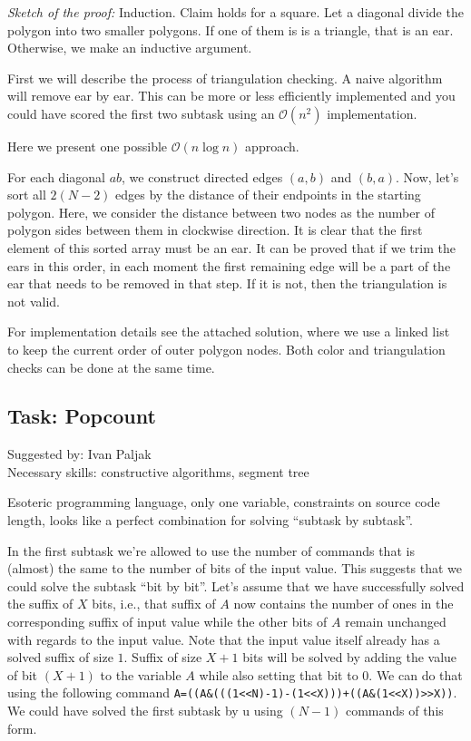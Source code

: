 \documentclass[a4paper]{article}
\begin{document}
\emph{Sketch of the proof: } \; Induction. Claim holds for a square.
Let a diagonal divide the polygon into two smaller polygons. If one of them is
is a triangle, that is an ear. Otherwise, we make an inductive argument.

First we will describe the process of triangulation checking. A naive algorithm
will remove ear by ear. This can be more or less efficiently implemented and
you could have scored the first two subtask using an $\mathcal{O}(n^2)$
implementation.

Here we present one possible $\mathcal{O}(n \log n)$ approach.

For each diagonal $ab$, we construct directed edges $(a, b)$ and $(b, a)$. Now,
let's sort all $2(N-2)$ edges by the distance of their endpoints in the starting
polygon. Here, we consider the distance between two nodes as the number of
polygon sides between them in clockwise direction. It is clear that the first
element of this sorted array must be an ear. It can be proved that if we trim
the ears in this order, in each moment the first remaining edge will be a part
of the ear that needs to be removed in that step. If it is not, then the
triangulation is not valid.

For implementation details see the attached solution, where we use a linked
list to keep the current order of outer polygon nodes. Both color and
triangulation checks can be done at the same time.

\subsection*{Task: Popcount}
\textsf{Suggested by: Ivan Paljak}\\
\textsf{Necessary skills: constructive algorithms, segment tree}

Esoteric programming language, only one variable, constraints on source code
length, looks like a perfect combination for solving ``subtask by subtask''.

In the first subtask we're allowed to use the number of commands that is
(almost) the same to the number of bits of the input value. This suggests
that we could solve the subtask ``bit by bit''. Let's assume that we have
successfully solved the suffix of $X$ bits, i.e., that suffix of $A$ now
contains the number of ones in the corresponding suffix of input value while
the other bits of $A$ remain unchanged with regards to the input value. Note
that the input value itself already has a solved suffix of size $1$. Suffix
of size $X+1$ bits will be solved by adding the value of bit $(X+1)$ to
the variable $A$ while also setting that bit to $0$. We can do that using
the following command \verb|A=((A&(((1<<N)-1)-(1<<X)))+((A&(1<<X))>>X))|.
We could have solved the first subtask by u using $(N-1)$ commands of this form.
\end{document}
